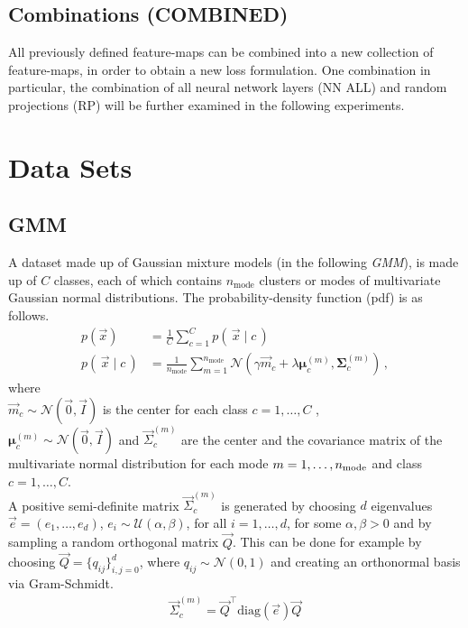 \subsection{Combinations (COMBINED)}
All previously defined feature-maps can be combined into a new collection of feature-maps,
in order to obtain a new loss formulation.
One combination in particular, the combination of all neural network layers (NN ALL) and random projections (RP) will be further examined in the following experiments.


\section{Data Sets}
\label{sec:datasets}

\subsection{GMM}
\label{sec:datasetgmm}
A dataset made up of Gaussian mixture models (in the following \textit{GMM}), 
is made up of $C$ classes, each of which contains $n_\text{mode}$ clusters or modes of multivariate Gaussian normal distributions. The probability-density function (pdf) is as follows.
\begin{align}
\label{eqn:gmm_distr}
    p(\vec x) &= \frac 1 C \sum_{c=1}^C p(\, \vec x \mid c \,) \nonumber\\
    p(\, \vec x \mid c \,) &= \frac 1 {n_\text{mode}} \sum _{m=1}^{n_\text{mode}}
    \mathcal N (\gamma \vec m_c + \lambda \boldsymbol \mu_c^{(m)}, \boldsymbol \Sigma_c^{(m)}) \, ,
\end{align}
where \\
$\vec m_c \sim \mathcal N (\vec 0, \vec I)$ is the center for each class $c=1,\ldots, C$ ,\\
$\boldsymbol \mu_c^{(m)} \sim \mathcal N (\vec 0, \vec I)$ and
$\vec \Sigma_c^{(m)}$ are the center and the covariance matrix of the multivariate normal distribution
for each mode $m=1,\ldots, n_{\textnormal{mode}}$ and class $c=1,\ldots, C$.  \\
A positive semi-definite matrix $\vec \Sigma_c^{(m)}$ is generated by choosing $d$ eigenvalues $\vec e = (e_1, \ldots, e_d)$, $e_i \sim \mathcal U(\alpha, \beta)$, for all $i=1, \ldots, d$, for some $\alpha, \beta > 0$ and 
by sampling a random orthogonal matrix $\vec Q$. 
This can be done for example by choosing $\vec Q = \{q_{ij}\}_{i,j=0}^{d}$, 
where $q_{ij} \sim \mathcal N(0, 1)$
and creating an orthonormal basis via Gram-Schmidt. 
\begin{align*}
    \vec \Sigma_c^{(m)} = \vec Q^\top \text{diag}(\vec e) \vec Q
\end{align*}

